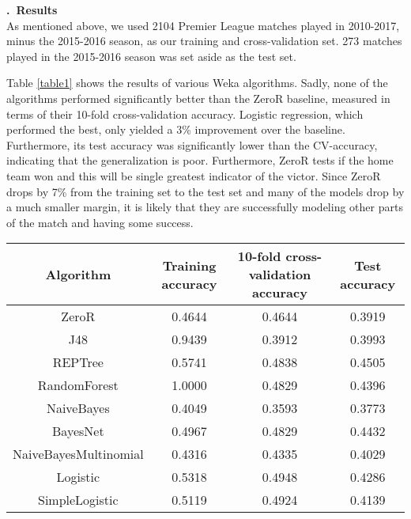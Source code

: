 \documentclass[a4paper,11pt,table]{article}
\renewcommand{\section}[1]{\stepcounter{section}\noindent\textbf{\arabic{section}.~#1}\\}
\begin{document}
\section{Results}
As mentioned above, we used 2104 Premier League matches played in 2010-2017, minus the 2015-2016 season, as our training and cross-validation set. 273 matches played in the 2015-2016 season was set aside as the test set.

Table \ref{table1} shows the results of various Weka algorithms. Sadly, none of the algorithms performed significantly better than the ZeroR baseline, measured in terms of their 10-fold cross-validation accuracy. Logistic regression, which performed the best, only yielded a 3\% improvement over the baseline. Furthermore, its test accuracy was significantly lower than the CV-accuracy, indicating that the generalization is poor. Furthermore, ZeroR tests if the home team won and this will be single greatest indicator of the victor. Since ZeroR drops by 7\% from the training set to the test set and many of the models drop by a much smaller margin, it is likely that they are successfully modeling other parts of the match and having some success.

\begin{center}
    \begin{tabular}{|c|c|c|c|}
        \hline
        Algorithm               &   Training accuracy  &   10-fold cross-validation accuracy  &   Test accuracy \\
        \hline
        ZeroR                   &   0.4644          &   0.4644      &   0.3919 \\
        \hline
        J48                     &   0.9439          &   0.3912      &   0.3993 \\
        \hline
        REPTree                 &   0.5741          &   0.4838      &   \cellcolor{red!25}0.4505 \\
        \hline
        RandomForest            &   \cellcolor{red!25}1.0000          &   0.4829      &   0.4396 \\
        \hline
        NaiveBayes              &   0.4049          &   0.3593      &   0.3773 \\
        \hline
        BayesNet                &   0.4967          &   0.4829      &   0.4432 \\
        \hline
        NaiveBayesMultinomial   &   0.4316          &   0.4335      &   0.4029 \\
        \hline
        Logistic                &   0.5318          &   \cellcolor{red!25}0.4948      &   0.4286 \\
        \hline
        SimpleLogistic          &   0.5119          &   0.4924      &   0.4139 \\
        \hline
    \end{tabular}
\end{center}
\end{document}

